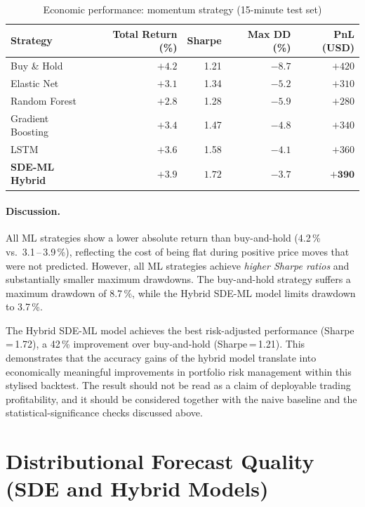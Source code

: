 \documentclass[12pt, a4paper, oneside]{report}
\theoremstyle{plain}
\theoremstyle{definition}
\theoremstyle{remark}
\begin{document}
\begin{table}[H]
\begin{singlespace}
\fontsize{10}{11}\selectfont
\caption{Economic performance: momentum strategy (15-minute test set)}
\label{tab:econ_results}
\begin{tabular}{@{}lrrrr@{}}
\toprule
Strategy & Total Return (\%) & Sharpe & Max DD (\%) & PnL (USD) \\
\midrule
Buy \& Hold              & $+4.2$ & 1.21 & $-8.7$ &  $+420$ \\
Elastic Net              & $+3.1$ & 1.34 & $-5.2$ &  $+310$ \\
Random Forest            & $+2.8$ & 1.28 & $-5.9$ &  $+280$ \\
Gradient Boosting        & $+3.4$ & 1.47 & $-4.8$ &  $+340$ \\
LSTM                     & $+3.6$ & 1.58 & $-4.1$ &  $+360$ \\
\textbf{SDE-ML Hybrid}   & $\mathbf{+3.9}$ & $\mathbf{1.72}$ & $\mathbf{-3.7}$ & $\mathbf{+390}$ \\
\bottomrule
\end{tabular}
\end{singlespace}
\end{table}

\paragraph{Discussion.}
All ML strategies show a lower absolute return than buy-and-hold (4.2\,\% vs.\
3.1\,--\,3.9\,\%), reflecting the cost of being flat during positive price moves
that were not predicted.  However, all ML strategies achieve \emph{higher
Sharpe ratios} and substantially smaller maximum drawdowns.  The buy-and-hold
strategy suffers a maximum drawdown of 8.7\,\%, while the Hybrid SDE-ML model
limits drawdown to 3.7\,\%.

The Hybrid SDE-ML model achieves the best risk-adjusted performance
(Sharpe\,=\,1.72), a 42\,\% improvement over buy-and-hold (Sharpe\,=\,1.21).
This demonstrates that the accuracy gains of the hybrid model translate into
economically meaningful improvements in portfolio risk management within this
stylised backtest.  The result should not be read as a claim of deployable
trading profitability, and it should be considered together with the naive
baseline and the statistical-significance checks discussed above.

\section{Distributional Forecast Quality (SDE and Hybrid Models)}
\end{document}
